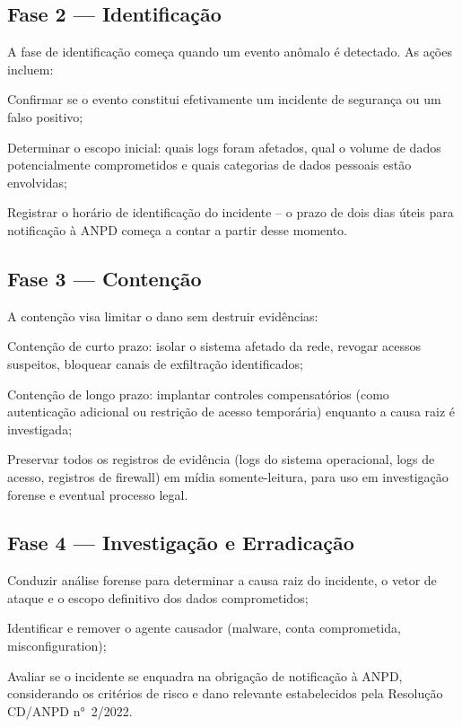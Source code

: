\subsection{Fase 2 — Identificação}
\label{subsec:identificacao}

A fase de identificação começa quando um evento anômalo é detectado. As ações incluem:

\begin{alineas}
    \item Confirmar se o evento constitui efetivamente um incidente de segurança ou um falso positivo;
    \item Determinar o escopo inicial: quais logs foram afetados, qual o volume de dados potencialmente comprometidos e quais categorias de dados pessoais estão envolvidas;
    \item Registrar o horário de identificação do incidente -- o prazo de dois dias úteis para notificação à ANPD começa a contar a partir desse momento.
\end{alineas}

\subsection{Fase 3 — Contenção}
\label{subsec:contencao}

A contenção visa limitar o dano sem destruir evidências:

\begin{alineas}
    \item Contenção de curto prazo: isolar o sistema afetado da rede, revogar acessos suspeitos, bloquear canais de exfiltração identificados;
    \item Contenção de longo prazo: implantar controles compensatórios (como autenticação adicional ou restrição de acesso temporária) enquanto a causa raiz é investigada;
    \item Preservar todos os registros de evidência (logs do sistema operacional, logs de acesso, registros de firewall) em mídia somente-leitura, para uso em investigação forense e eventual processo legal.
\end{alineas}

\subsection{Fase 4 — Investigação e Erradicação}
\label{subsec:investigacao}

\begin{alineas}
    \item Conduzir análise forense para determinar a causa raiz do incidente, o vetor de ataque e o escopo definitivo dos dados comprometidos;
    \item Identificar e remover o agente causador (malware, conta comprometida, misconfiguration);
    \item Avaliar se o incidente se enquadra na obrigação de notificação à ANPD, considerando os critérios de risco e dano relevante estabelecidos pela Resolução CD/ANPD n°~2/2022.
\end{alineas}

